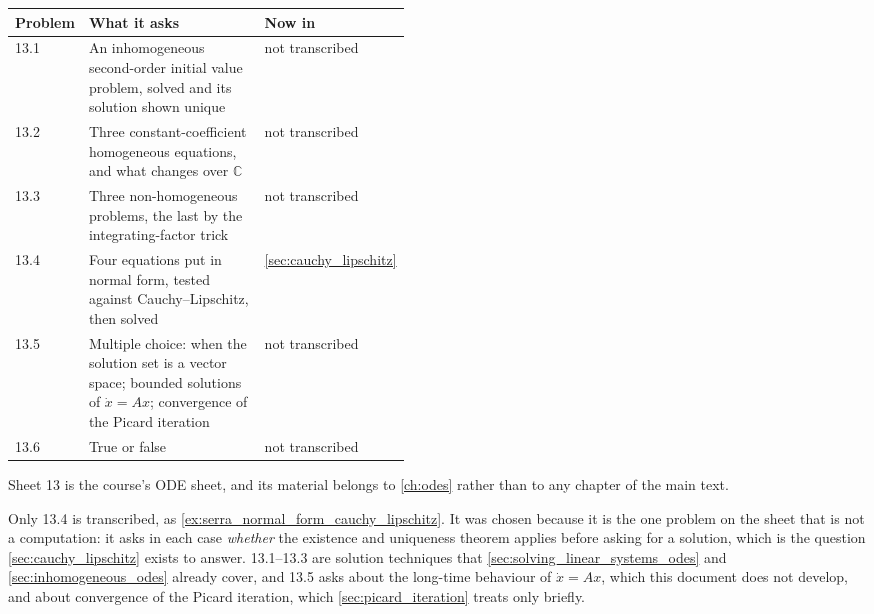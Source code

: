\begin{center}
\begin{tabular}{@{}l p{0.46\linewidth} l@{}}
\textbf{Problem} & \textbf{What it asks} & \textbf{Now in} \\
\hline
13.1 & An inhomogeneous second-order initial value problem, solved and its solution shown
  unique & not transcribed \\[3pt]
13.2 & Three constant-coefficient homogeneous equations, and what changes over $\mathbb{C}$
  & not transcribed \\[3pt]
13.3 & Three non-homogeneous problems, the last by the integrating-factor trick
  & not transcribed \\[3pt]
13.4 & Four equations put in normal form, tested against Cauchy--Lipschitz, then solved
  & \cref{sec:cauchy_lipschitz} \\[3pt]
13.5 & Multiple choice: when the solution set is a vector space; bounded solutions of
  $\dot x = Ax$; convergence of the Picard iteration & not transcribed \\[3pt]
13.6 & True or false & not transcribed \\
\end{tabular}
\end{center}

\begin{ainote}
Sheet 13 is the course's ODE sheet, and its material belongs to \cref{ch:odes} rather than to any
chapter of the main text.

Only 13.4 is transcribed, as \cref{ex:serra_normal_form_cauchy_lipschitz}. It was chosen because it
is the one problem on the sheet that is not a computation: it asks in each case \emph{whether} the
existence and uniqueness theorem applies before asking for a solution, which is the question
\cref{sec:cauchy_lipschitz} exists to answer. 13.1--13.3 are solution techniques that
\cref{sec:solving_linear_systems_odes} and \cref{sec:inhomogeneous_odes} already cover, and 13.5
asks about the long-time behaviour of $\dot x = Ax$, which this document does not develop, and
about convergence of the Picard iteration, which \cref{sec:picard_iteration} treats only briefly.
\end{ainote}
